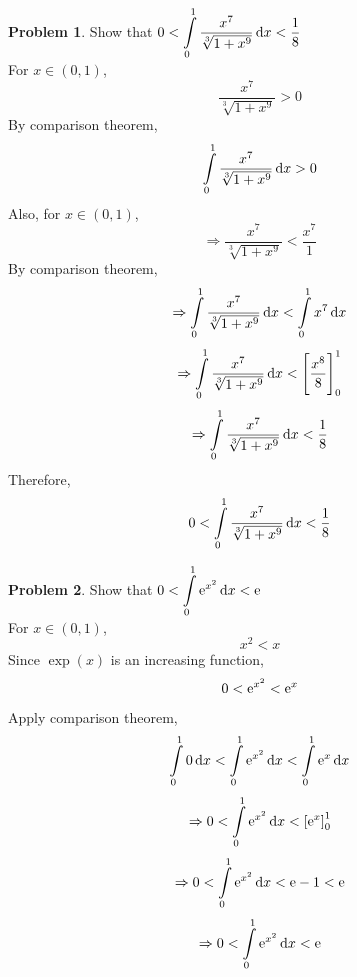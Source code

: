 \documentclass[14]{article}
\theoremstyle{definition}
\newtheorem{prob}{Problem}
\theoremstyle{case}
\begin{document}
\pagebreak
\begin{prob}
Show that $0 < \displaystyle \int\limits_0^1 \dfrac{x^7}{\sqrt[3]{1+x^9}} \dif x < \dfrac18$\\
For $x \in (0, 1)$,
\[\dfrac{x^7}{\sqrt[3]{1+x^9}} > 0\]
By comparison theorem,
\[\int\limits_0^1 \dfrac{x^7}{\sqrt[3]{1+x^9}} \dif x > 0\]
Also, for $x \in (0, 1)$,
\[\Rightarrow \dfrac{x^7}{\sqrt[3]{1 + x^9}} < \dfrac{x^7}1\]
By comparison theorem,
\[\Rightarrow \int\limits_0^1 \dfrac{x^7}{\sqrt[3]{1+x^9}} \dif x < \int\limits_0^1 x^7 \dif x\]
\[\Rightarrow \int\limits_0^1 \dfrac{x^7}{\sqrt[3]{1+x^9}} \dif x < \left[\dfrac{x^8}{8}\right]_0^1\]
\[\Rightarrow\int\limits_0^1 \dfrac{x^7}{\sqrt[3]{1+x^9}} \dif x < \dfrac18\]
Therefore,
\[0 < \int\limits_0^1 \dfrac{x^7}{\sqrt[3]{1+x^9}} \dif x < \dfrac18\]
\end{prob}
\begin{prob}
Show that $0 < \displaystyle\int\limits_0^1 {\rm e}^{x^2} \dif x < {\rm e}$\\
For $x \in (0, 1)$,
\[x^2 < x\]
Since $\exp(x)$ is an increasing function,
\[0 < {\rm e}^{x^2} < {\rm e}^x\]
Apply comparison theorem,
\[\int\limits_0^1 0\dif x < \int\limits_0^1{\rm e}^{x^2} \dif x < \int\limits_0^1{\rm e}^x \dif x\]
\[\Rightarrow 0 < \int\limits_0^1 {\rm e}^{x^2} \dif x < \left[ {\rm e}^x \right]_0^1\]
\[\Rightarrow 0 < \int\limits_0^1 {\rm e}^{x^2} \dif x < {\rm e} - 1 < {\rm e} \]
\[\Rightarrow 0 < \int\limits_0^1 {\rm e}^{x^2} \dif x < {\rm e} \]
\end{prob}
\pagebreak
\end{document}

